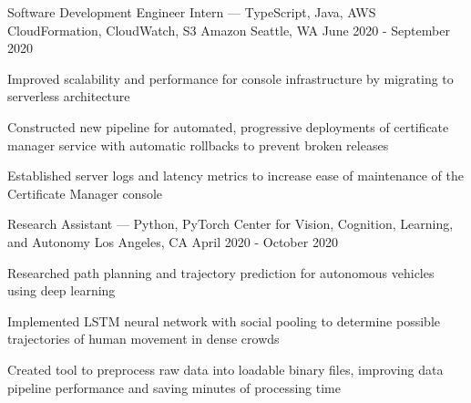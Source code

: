 \documentclass[12pt, letterpaper]{awesome-cv}
\begin{document}
\begin{cventries}
  \cventry
    {Sof\/tware Development Engineer Intern — TypeScript, Java, AWS CloudFormation, CloudWatch, S3} %
    {Amazon} %
    {Seattle, WA} %
    {June 2020 - September 2020} %
    {
      \begin{cvitems} %
        \item {Improved scalability and performance for console infrastructure by migrating to serverless architecture} 
        \item {Constructed new pipeline for automated, progressive deployments of certificate manager service with automatic rollbacks to prevent broken releases}
        \item {Established server logs and latency metrics to increase ease of maintenance of the Certificate Manager console}
      \end{cvitems}
    }

  \cventry
    {Research Assistant — Python, PyTorch} %
    {Center for Vision, Cognition, Learning, and Autonomy} %
    {Los Angeles, CA} %
    {April 2020 - October 2020} %
    {
      \begin{cvitems} %
        \item {Researched path planning and trajectory prediction for autonomous vehicles using deep learning}
        \item {Implemented LSTM neural network with social pooling to determine possible trajectories of human movement in dense crowds}
        \item {Created tool to preprocess raw data into loadable binary files, improving data pipeline performance and saving minutes of processing time}
      \end{cvitems}
    }



\end{cventries}
\end{document}
